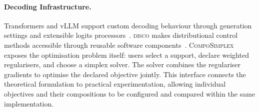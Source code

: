 \documentclass{article} %
\begin{document}
\paragraph{Decoding Infrastructure.}
Transformers and vLLM support custom decoding behaviour through generation settings and extensible logits processors~\citep{wolf2019huggingface,kwon2023efficient}.
\textsc{disco} makes distributional control methods accessible through reusable software components~\citep{kruszewski2023disco}.
\textsc{CompoSimplex} exposes the optimisation problem itself: users select a support, declare weighted regularisers, and choose a simplex solver.
The solver combines the regulariser gradients to optimise the declared objective jointly.
This interface connects the theoretical formulation to practical experimentation, allowing individual objectives and their compositions to be configured and compared within the same implementation.
\end{document}
